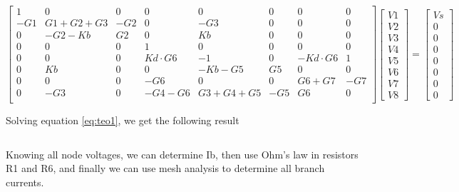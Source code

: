 \begin{equation}
\label{eq:teo1}
	\begin{bmatrix}
	1 & 0 & 0 & 0 & 0 & 0 & 0 & 0 \\ -G1 & G1+G2+G3 & -G2 & 0 & -G3 & 0 & 0 & 0 \\ 0 & -G2-Kb & G2 & 0 & Kb & 0 & 0 & 0 \\ 0 & 0 & 0 & 1 & 0 & 0 & 0 & 0 \\ 0 & 0 & 0 & Kd \cdot G6 & -1 & 0 & -Kd 		\cdot G6 & 1 \\ 0 & Kb & 0 & 0 & -Kb-G5 & G5 & 0 & 0 \\ 0 & 0 & 0 & -G6 & 0 & 0 & G6+G7 & -G7 \\ 0 & -G3 & 0 & -G4-G6 & G3+G4+G5 & -G5 & G6 & 0 \\
	\end{bmatrix}
	\begin{bmatrix}
	V1 \\ V2 \\ V3 \\ V4 \\ V5 \\ V6 \\ V7 \\ V8
	\end{bmatrix}
	=
	\begin{bmatrix}
	Vs \\ 0 \\ 0 \\ 0 \\ 0 \\ 0 \\ 0 \\ 0
	\end{bmatrix}
\end{equation}

\par Solving equation \ref{eq:teo1}, we get the following result

\begin{table}[h!]
\centering
\begin{tabularx}{0.6\textwidth} {
  | >{\raggedright\arraybackslash}X
  | >{\raggedleft\arraybackslash}X | }
 \hline
 
\end{tabularx}
\end{table}

\par Knowing all node voltages, we can determine Ib, then use Ohm's law in resistors R1 and R6, and finally we can use mesh analysis to determine all branch currents.

